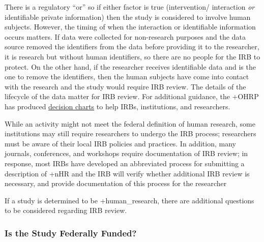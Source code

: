 \documentclass[
]{WileySix}
\begin{document}
There is a regulatory ``or'' so if either factor is true (intervention/ interaction \emph{or} identifiable private information) then the study is considered to involve human subjects. However, the timing of when the interaction or identifiable information occurs matters. If data were collected for non-research purposes and the data source removed the identifiers from the data before providing it to the researcher, it is research but without human identifiers, so there are no people for the IRB to protect. On the other hand, if the researcher receives identifiable data and is the one to remove the identifiers, then the human subjects have come into contact with the research and the study would require IRB review. The details of the lifecycle of the data matter for IRB review. For additional guidance, the +OHRP\textbar{} has produced \href{https://www.hhs.gov/ohrp/regulations-and-policy/decision-charts/index.html}{decision charts} to help IRBs, institutions, and researchers.

While an activity might not meet the federal definition of human research, some institutions may still require researchers to undergo the IRB process; researchers must be aware of their local IRB policies and practices. In addition, many journals, conferences, and workshops require documentation of IRB review; in response, most IRBs have developed an abbreviated process for submitting a description of +nHR\textbar{} and the IRB will verify whether additional IRB review is necessary, and provide documentation of this process for the researcher

If a study is determined to be +human\_research\textbar, there are additional questions to be considered regarding IRB review.

\hypertarget{is-the-study-federally-funded}{%
\subsubsection{Is the Study Federally Funded?}\label{is-the-study-federally-funded}}
\end{document}
